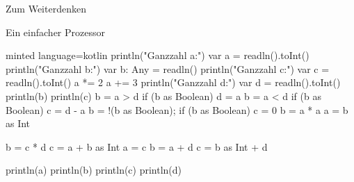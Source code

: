 \begin{task}[points=auto]{Zum Weiterdenken }
\begin{subtask*}[points=0]{Ein einfacher Prozessor}
        \begin{solution}
            \begin{codeBlock}[]{minted language=kotlin}
                println("Ganzzahl a:")
                var a = readln().toInt()
                println("Ganzzahl b:")
                var b: Any = readln()
                println("Ganzzahl c:")
                var c = readln().toInt()
                a *= 2
                a += 3
                println("Ganzzahl d:")
                var d = readln().toInt()
                println(b)
                println(c)
                b = a > d
                if (b as Boolean) {
                    d = a
                }
                b = a < d
                if (b as Boolean) {
                    c = d - a
                }
                b = !(b as Boolean);
                if (b as Boolean) {
                    c = 0
                }
                b = a * a
                a = b as Int

                b = c * d
                c = a + b as Int
                a = c
                b = a + d
                c = b as Int + d

                println(a)
                println(b)
                println(c)
                println(d)
            \end{codeBlock}
        \end{solution}
    \end{subtask*}
\end{task}

